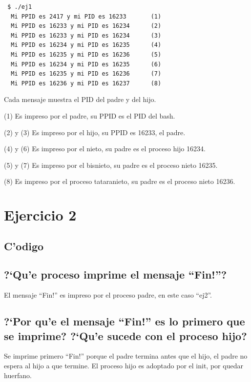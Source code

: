 \documentclass[a4paper,10pt]{article}
\newcommand{\?}{?`}
\begin{document}
\begin{lstlisting}
 $ ./ej1
  Mi PPID es 2417 y mi PID es 16233       (1)
  Mi PPID es 16233 y mi PID es 16234      (2)
  Mi PPID es 16233 y mi PID es 16234      (3)
  Mi PPID es 16234 y mi PID es 16235      (4)
  Mi PPID es 16235 y mi PID es 16236      (5)
  Mi PPID es 16234 y mi PID es 16235      (6)
  Mi PPID es 16235 y mi PID es 16236      (7)
  Mi PPID es 16236 y mi PID es 16237      (8)
\end{lstlisting}

Cada mensaje muestra el PID del padre y del hijo.

\begin{description}
 \item (1) Es impreso por el padre, su PPID es el PID del bash.
 \item (2) y (3) Es impreso por el hijo, su PPID es 16233, el padre.
 \item (4) y (6) Es impreso por el nieto, su padre es el proceso hijo 16234.
 \item (5) y (7) Es impreso por el bisnieto, su padre es el proceso nieto 16235.
 \item (8) Es impreso por el proceso tataranieto, su padre es el proceso nieto 16236.
\end{description}

\section{Ejercicio 2}

\subsection{C'odigo}


\subsection[Punto A]{\?Qu'e proceso imprime el mensaje ``Fin!''?}
El mensaje ``Fin!'' es impreso por el proceso padre, en este caso ``ej2''.

\subsection[Punto B]{\?Por qu'e el mensaje ``Fin!'' es lo primero que se imprime? \?Qu'e sucede con el proceso hijo?}
Se imprime primero ``Fin!'' porque el padre termina antes que el hijo, el padre no espera al hijo a que termine. El proceso hijo es adoptado por el init, por quedar huerfano.
\end{document}
